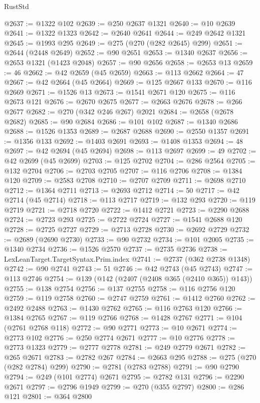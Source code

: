 \begin{lexlean}{RustStd}
\begin{coremodule}
@2637 := @1322 @102
@2639 := @250 @2637 @1321
@2640 := @10 @2639
@2641 := @1322 @1323
@2642 := @2640 @2641
@2644 := @249 @2642 @1321
@2645 := @1993 @295
@2649 := @275 (@270 (@282 @2645) @299)
@2651 := @2644 (@2448 @2649)
@2652 := @90 @2651
@2653 := @1340 @2637
@2656 := @2653 @1321 (@1423 @2048)
@2657 := @90 @2656
@2658 := @2653 @13
@2659 := 46
@2662 := @42 @2659 (@45 @2659)
@2663 := @113 @2662
@2664 := 47
@2667 := @42 @2664 (@45 @2664)
@2669 := @125 @2667 @133
@2670 := @116 @2669
@2671 := @1526 @13
@2673 := @1541 @2671 @120
@2675 := @116 @2673 @121
@2676 := @2670 @2675
@2677 := @2663 @2676
@2678 := @266 @2677
@2682 := @270 (@342 @246 @267) @2021
@2684 := @2658 (@2678 @2682)
@2685 := @90 @2684
@2686 := @101 @102
@2687 := @1340 @2686
@2688 := @1526 @1353
@2689 := @2687 @2688
@2690 := @2550 @1357
@2691 := @1356 @133
@2692 := @1403 @2691
@2693 := @1408 @1353
@2694 := 48
@2697 := @42 @2694 (@45 @2694)
@2698 := @113 @2697
@2699 := 49
@2702 := @42 @2699 (@45 @2699)
@2703 := @125 @2702
@2704 := @286 @2564
@2705 := @132 @2704
@2706 := @2703 @2705
@2707 := @116 @2706
@2708 := @1384 @120
@2709 := @2583 @2708
@2710 := @2707 @2709
@2711 := @2698 @2710
@2712 := @1364 @2711
@2713 := @2693 @2712
@2714 := 50
@2717 := @42 @2714 (@45 @2714)
@2718 := @113 @2717
@2719 := @132 @293
@2720 := @119 @2719
@2721 := @2718 @2720
@2722 := @1412 @2721
@2723 := @2290 @2688
@2724 := @2723 @293
@2725 := @2722 @2724
@2727 := @1541 @2688 @120
@2728 := @2725 @2727
@2729 := @2713 @2728
@2730 := @2692 @2729
@2732 := @2689 (@2690 @2730)
@2733 := @90 @2732
@2734 := @101 @2005
@2735 := @1340 @2734
@2736 := @1526 @2570
@2737 := @2735 @2736
@2738 := LexLeanTarget.TargetSyntax.Prim.index
@2741 := @2737 (@362 @2738 @1348)
@2742 := @90 @2741
@2743 := 51
@2746 := @42 @2743 (@45 @2743)
@2747 := @113 @2746
@2754 := @139 (@142 (@2407 (@2408 @365 (@2410 @365)) @143))
@2755 := @138 @2754
@2756 := @137 @2755
@2758 := @116 @2756 @120
@2759 := @119 @2758
@2760 := @2747 @2759
@2761 := @1412 @2760
@2762 := @2492 @2488
@2763 := @1430 @2762
@2765 := @116 @2763 @120
@2766 := @1384 @2765
@2767 := @119 @2766
@2768 := @1428 @2767
@2771 := @104 (@2761 @2768 @118)
@2772 := @90 @2771
@2773 := @10 @2671
@2774 := @2773 @102
@2776 := @250 @2774 @2671
@2777 := @10 @2776
@2778 := @2773 @1323
@2779 := @2777 @2778
@2781 := @249 @2779 @2671
@2782 := @265 @2671
@2783 := @2782 @267
@2784 := @2663 @295
@2788 := @275 (@270 (@282 @2784) @299)
@2790 := @2781 (@2783 @2788)
@2791 := @90 @2790
@2794 := @249 (@101 @2774) @2671
@2795 := @2782 @131
@2796 := @2290 @2671
@2797 := @2796 @1949
@2799 := @270 (@355 @2797)
@2800 := @286 @121
@2801 := @364 @2800

\end{coremodule}
\end{lexlean}
